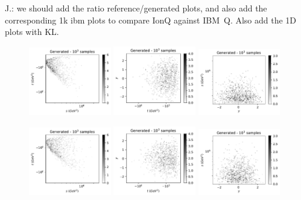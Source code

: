 \documentclass[twocolumn,preprintnumbers,superscriptaddress]{revtex4-2}
\begin{document}
{\color{red} J.: we should add the ratio reference/generated plots,
  and also add the corresponding 1k ibm plots to compare IonQ against
  IBM~Q. Also add the 1D plots with KL.}


\begin{figure}
  \includegraphics[width=0.32\textwidth]{plots/hardware/ibm_santiago/s-t_FAKE_IBM_1k.pdf}%
  \includegraphics[width=0.32\textwidth]{plots/hardware/ibm_santiago/t-y_FAKE_IBM_1k.pdf}%
  \includegraphics[width=0.32\textwidth]{plots/hardware/ibm_santiago/y-s_FAKE_IBM_1k.pdf}

  \includegraphics[width=0.32\textwidth]{plots/hardware/ionQ/s-t_FAKE_ionQ_1k.pdf}%
  \includegraphics[width=0.32\textwidth]{plots/hardware/ionQ/t-y_FAKE_ionQ_1k.pdf}%
  \includegraphics[width=0.32\textwidth]{plots/hardware/ionQ/y-s_FAKE_ionQ_1k.pdf}


\end{figure}
\end{document}
